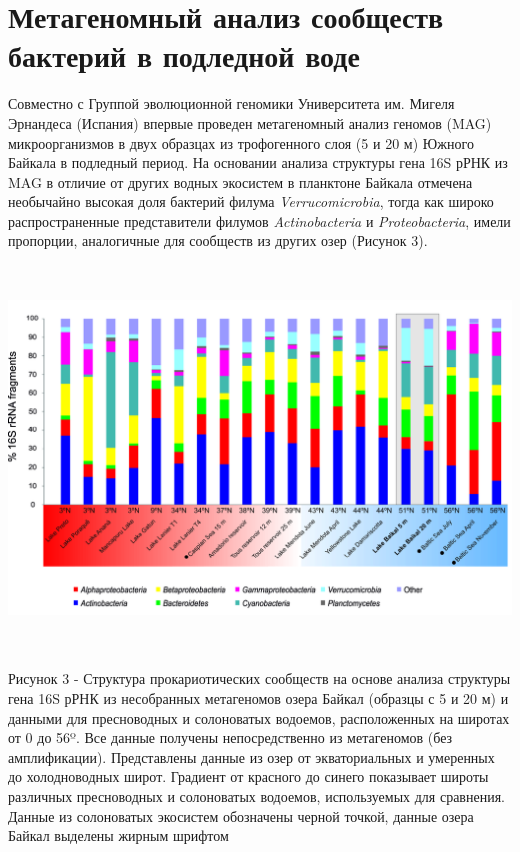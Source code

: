 \documentclass[a4paper,12pt,openany,final]{extreport}
\begin{document}
\chapter{Метагеномный анализ сообществ бактерий в подледной
воде} \label{chap:3}

Совместно с Группой эволюционной геномики Университета им. Мигеля
Эрнандеса (Испания) впервые проведен метагеномный анализ геномов (MAG)
микроорганизмов в двух образцах из трофогенного слоя (5 и 20 м) Южного
Байкала в подледный период. На основании анализа структуры гена 16S рРНК
из MAG в отличие от других водных экосистем в планктоне Байкала отмечена
необычайно высокая доля бактерий филума \emph{Verrucomicrobia}, тогда
как широко распространенные представители филумов \emph{Actinobacteria}
и \emph{Proteobacteria}, имели пропорции, аналогичные для сообществ из
других озер (Рисунок 3).

\includegraphics[width=6.42778in,height=4.01875in]{media/image8.png}

Рисунок 3 - Структура прокариотических сообществ на основе анализа
структуры гена 16S рРНК из несобранных метагеномов озера Байкал (образцы
с 5 и 20 м) и данными для пресноводных и солоноватых водоемов,
расположенных на широтах от 0 до 56º. Все данные получены
непосредственно из метагеномов (без амплификации). Представлены данные
из озер от экваториальных и умеренных до холодноводных широт. Градиент
от красного до синего показывает широты различных пресноводных и
солоноватых водоемов, используемых для сравнения. Данные из солоноватых
экосистем обозначены черной точкой, данные озера Байкал выделены жирным
шрифтом
\end{document}
